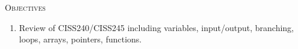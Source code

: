\textsc{Objectives}
\begin{enumerate}[topsep=0pt]
\item Review of CISS240/CISS245 including variables, input/output, branching, 
loops, arrays, pointers, functions.
\end{enumerate}
